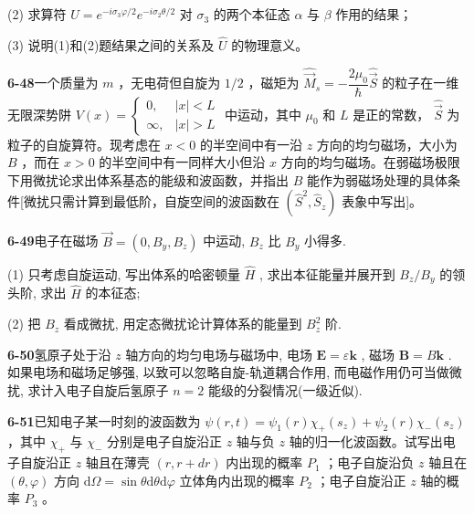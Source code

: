 (2) 求算符 $\displaystyle \hat{U} = e^{-i\sigma_3\varphi / 2} e^{-i\sigma_2\theta / 2}$ 对 $\displaystyle \sigma_3$ 的两个本征态 $\displaystyle \alpha$ 与 $\displaystyle \beta$ 作用的结果；

(3) 说明(1)和(2)题结果之间的关系及 $\displaystyle \hat{U}$ 的物理意义。

\vfill

\newpage

\textbf{6-48}\quad 一个质量为 $\displaystyle m$ ，无电荷但自旋为 $\displaystyle 1/2$ ，磁矩为 $\displaystyle \hat{\vec{M}}_s = -\dfrac{2\mu_0}{\hbar}\hat{\vec{S}}$ 的粒子在一维无限深势阱 $\displaystyle V(x) = \begin{cases} 0, & |x| < L \\ \infty, & |x| > L \end{cases}$ 中运动，其中 $\displaystyle \mu_0$ 和 $\displaystyle L$ 是正的常数， $\displaystyle \hat{\vec{S}}$ 为粒子的自旋算符。现考虑在 $\displaystyle x < 0$ 的半空间中有一沿 $\displaystyle z$ 方向的均匀磁场，大小为 $\displaystyle B$ ，而在 $\displaystyle x > 0$ 的半空间中有一同样大小但沿 $\displaystyle x$ 方向的均匀磁场。在弱磁场极限下用微扰论求出体系基态的能级和波函数，并指出 $\displaystyle B$ 能作为弱磁场处理的具体条件[微扰只需计算到最低阶，自旋空间的波函数在 $\displaystyle (\hat{S}^2, \hat{S}_z)$ 表象中写出]。

\vfill

\newpage

\textbf{6-49}\quad 电子在磁场 $\displaystyle \vec{B} = (0, B_y, B_z)$ 中运动, $\displaystyle B_z$ 比 $\displaystyle B_y$ 小得多.

(1) 只考虑自旋运动, 写出体系的哈密顿量 $\displaystyle \hat{H}$ , 求出本征能量并展开到 $\displaystyle B_z / B_y$ 的领头阶, 求出 $\displaystyle \hat{H}$ 的本征态;

(2) 把 $\displaystyle B_z$ 看成微扰, 用定态微扰论计算体系的能量到 $\displaystyle B_z^2$ 阶.

\vfill

\newpage

\textbf{6-50}\quad 氢原子处于沿 $\displaystyle z$ 轴方向的均匀电场与磁场中, 电场 $\displaystyle \pmb{E} = \varepsilon \pmb{k}$ , 磁场 $\displaystyle \pmb{B} = B\pmb{k}$ . 如果电场和磁场足够强, 以致可以忽略自旋-轨道耦合作用, 而电磁作用仍可当做微扰, 求计入电子自旋后氢原子 $\displaystyle n = 2$ 能级的分裂情况(一级近似).

\vfill

\newpage

\textbf{6-51}\quad 已知电子某一时刻的波函数为 $\displaystyle \psi(r, t) = \psi_1(r)\chi_+(s_z) + \psi_2(r)\chi_-(s_z)$ ，其中 $\displaystyle \chi_+$ 与 $\displaystyle \chi_-$ 分别是电子自旋沿正 $\displaystyle z$ 轴与负 $\displaystyle z$ 轴的归一化波函数。试写出电子自旋沿正 $\displaystyle z$ 轴且在薄壳 $\displaystyle (r, r + dr)$ 内出现的概率 $\displaystyle P_1$ ；电子自旋沿负 $\displaystyle z$ 轴且在 $\displaystyle (\theta, \varphi)$ 方向 $\displaystyle \mathrm{d}\Omega = \sin \theta \mathrm{d}\theta \mathrm{d}\varphi$ 立体角内出现的概率 $\displaystyle P_2$ ；电子自旋沿正 $\displaystyle z$ 轴的概率 $\displaystyle P_3$ 。

